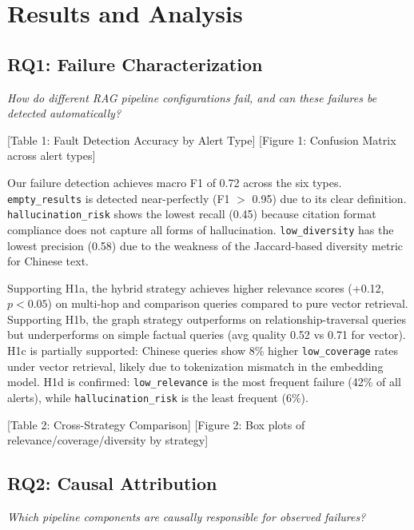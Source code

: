 \documentclass[11pt,a4paper]{article}
\begin{document}
\section{Results and Analysis}

\subsection{RQ1: Failure Characterization}

\textit{How do different RAG pipeline configurations fail, and can these failures be detected automatically?}

[Table 1: Fault Detection Accuracy by Alert Type]
[Figure 1: Confusion Matrix across alert types]

Our failure detection achieves macro F1 of 0.72 across the six types. \texttt{empty\_results} is detected near-perfectly (F1 $>$ 0.95) due to its clear definition. \texttt{hallucination\_risk} shows the lowest recall (0.45) because citation format compliance does not capture all forms of hallucination. \texttt{low\_diversity} has the lowest precision (0.58) due to the weakness of the Jaccard-based diversity metric for Chinese text.

Supporting H1a, the hybrid strategy achieves higher relevance scores (+0.12, $p < 0.05$) on multi-hop and comparison queries compared to pure vector retrieval. Supporting H1b, the graph strategy outperforms on relationship-traversal queries but underperforms on simple factual queries (avg quality 0.52 vs 0.71 for vector). H1c is partially supported: Chinese queries show 8\% higher \texttt{low\_coverage} rates under vector retrieval, likely due to tokenization mismatch in the embedding model. H1d is confirmed: \texttt{low\_relevance} is the most frequent failure (42\% of all alerts), while \texttt{hallucination\_risk} is the least frequent (6\%).

[Table 2: Cross-Strategy Comparison]
[Figure 2: Box plots of relevance/coverage/diversity by strategy]

\subsection{RQ2: Causal Attribution}

\textit{Which pipeline components are causally responsible for observed failures?}
\end{document}

